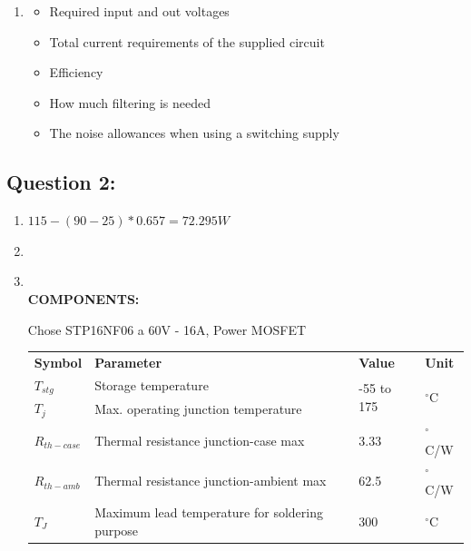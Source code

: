 \documentclass[11pt]{article}
\newcommand{\Newpage}{\end{preview}\begin{preview}}
\newcommand\Item[1][]{%
  \ifx\relax#1\relax  \item \else \item[#1] \fi
  \abovedisplayskip=0pt\abovedisplayshortskip=0pt~\vspace*{-\baselineskip}}
\begin{document}
\begin{preview}
\begin{enumerate}[label=\alph*)]
          \item \begin{itemize}
            \item Required input and out voltages
            \item Total current requirements of the supplied circuit
            \item Efficiency
            \item How much filtering is needed
            \item The noise allowances when using a switching supply 
          \end{itemize}
\end{enumerate}

\Newpage
\section*{Question 2:}
\begin{enumerate}[label=\alph*)]
          \item $115-(90-25)*0.657=72.295W$
          \Item \\ 
          \textbf{COMPONENTS:}

          Chose STP16NF06 a 60V - 16A, Power MOSFET\\
          \begin{tabular}{llll}
            \textbf{Symbol} & \textbf{Parameter}                                  & \textbf{Value}              & \textbf{Unit}              \\
            $T_{stg}$           & Storage temperature                             & \multirow{2}{*}{-55 to 175} & \multirow{2}{*}{$^\circ$C} \\
            $T_{j}$             & Max. operating junction temperature             &                             &                            \\
            $R_{th-case}$        & Thermal resistance junction-case max           & 3.33                        & $^\circ$C/W                \\
            $R_{th-amb}$         & Thermal resistance junction-ambient max        & 62.5                        & $^\circ$C/W                \\
            $T_{J}$              & Maximum lead temperature for soldering purpose & 300                         & $^\circ$C                     
          \end{tabular} 


\end{enumerate}
\end{preview}
\end{document}
